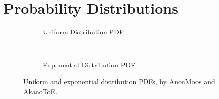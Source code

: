 \chapter{Probability Distributions}
\label{dist}

\begin{figure}
  \centering

  \begin{subfigure}[b]{0.48\textwidth}\centering
  \caption{Uniform Distribution PDF}
  \label{fig:dist:uniform}
  \end{subfigure}
  ~
  \begin{subfigure}[b]{\wd\largestimage}\centering
    \usebox{\largestimage}
  \caption{Exponential Distribution PDF}
  \label{fig:dist:exp}
  \end{subfigure}
\caption{
Uniform and exponential distribution PDFs,
by \href{https://en.wikipedia.org/wiki/File:Uniform_Distribution_PDF_SVG.svg}{AnonMoos}
and \href{https://en.wikipedia.org/wiki/File:Exponential_probability_density.svg}{AkanoToE}.
\label{fig:dist:uniform_exp}
}
\end{figure}


